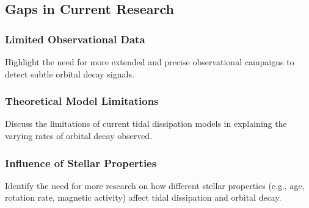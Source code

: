 \documentclass[oneside,12pt]{amsart}
\numberwithin{page}{section}
\begin{document}







\subsection{Gaps in Current Research}

\subsubsection{Limited Observational Data}
Highlight the need for more extended and precise observational campaigns to detect subtle orbital decay signals.

\subsubsection{Theoretical Model Limitations}
Discuss the limitations of current tidal dissipation models in explaining the varying rates of orbital decay observed.

\subsubsection{Influence of Stellar Properties}
Identify the need for more research on how different stellar properties (e.g., age, rotation rate, magnetic activity) affect tidal dissipation and orbital decay.
\end{document}
